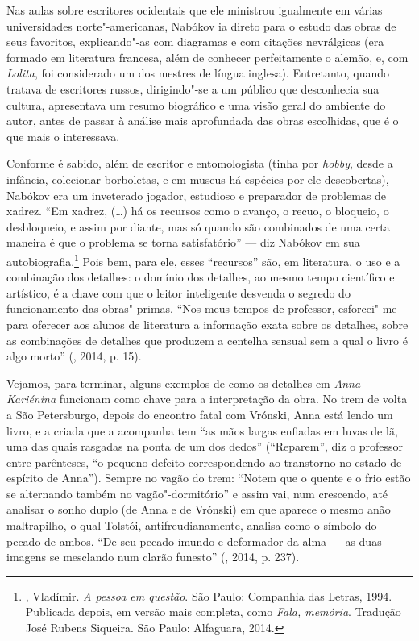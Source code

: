 Nas aulas sobre escritores ocidentais que ele ministrou igualmente em
várias universidades norte"-americanas, Nabókov ia direto para o estudo das
obras de seus favoritos, explicando"-as com diagramas e com citações
nevrálgicas (era formado em literatura francesa, além de conhecer
perfeitamente o alemão, e, com \emph{Lolita}, foi considerado um dos
mestres de língua inglesa). Entretanto, quando tratava de escritores
russos, dirigindo"-se a um público que desconhecia sua
cultura, apresentava um resumo biográfico e uma visão geral do ambiente
do autor, antes de passar à análise mais aprofundada das
obras escolhidas, que é o que mais o interessava.

Conforme é sabido, além de escritor e entomologista (tinha por
\emph{hobby}, desde a infância, colecionar borboletas, e em museus
há espécies por ele descobertas), Nabókov era um inveterado
jogador, estudioso e preparador de problemas de xadrez. ``Em xadrez,
(\ldots{}) há os recursos como o avanço, o recuo, o bloqueio, o desbloqueio, e
assim por diante, mas só quando são combinados de uma certa maneira é
que o problema se torna satisfatório'' --- diz Nabókov em sua
autobiografia.\footnote{, Vladímir. \emph{A pessoa em questão}. São Paulo: Companhia das Letras, 1994.
Publicada depois, em versão mais completa, como \emph{Fala, memória}. Tradução José Rubens Siqueira. São Paulo: Alfaguara, 2014.} Pois bem,
para ele, esses ``recursos'' são, em literatura, o uso e a combinação
dos detalhes: o domínio dos detalhes, ao mesmo tempo científico e
artístico, é a chave com que o leitor inteligente desvenda o segredo
do funcionamento das obras"-primas. ``Nos meus tempos de professor,
esforcei"-me para oferecer aos alunos de literatura a informação exata
sobre os detalhes, sobre as combinações de detalhes que produzem a
centelha sensual sem a qual o livro é algo morto'' (, 2014, p. 15).

Vejamos, para terminar, alguns exemplos de como os detalhes em
\emph{Anna Kariénina} funcionam como chave para a
interpretação da obra. No trem de volta a São Petersburgo, depois do
encontro fatal com Vrónski, Anna está lendo um livro, e a criada que a
acompanha tem ``as mãos largas enfiadas em luvas de lã, uma das quais
rasgadas na ponta de um dos dedos'' (``Reparem'', diz o
professor entre parênteses, ``o pequeno defeito
correspondendo ao transtorno no estado de espírito de Anna'').
Sempre no vagão do trem: ``Notem que o quente e o frio estão se
alternando também no vagão"-dormitório'' e assim vai, num crescendo, até
analisar o sonho duplo (de Anna e de Vrónski) em que aparece o mesmo
anão maltrapilho, o qual Tolstói, antifreudianamente, analisa como o
símbolo do pecado de ambos. ``De seu pecado imundo e deformador da alma
--- as duas imagens se mesclando num clarão funesto'' (, 2014, p. 237).

